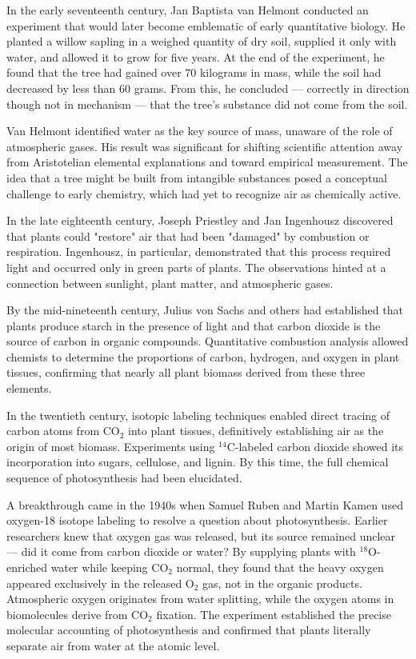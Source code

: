 \begin{historical}
In the early seventeenth century, Jan Baptista van Helmont conducted an experiment that would later become emblematic of early quantitative biology. He planted a willow sapling in a weighed quantity of dry soil, supplied it only with water, and allowed it to grow for five years. At the end of the experiment, he found that the tree had gained over 70 kilograms in mass, while the soil had decreased by less than 60 grams. From this, he concluded — correctly in direction though not in mechanism — that the tree's substance did not come from the soil.

Van Helmont identified water as the key source of mass, unaware of the role of atmospheric gases. His result was significant for shifting scientific attention away from Aristotelian elemental explanations and toward empirical measurement. The idea that a tree might be built from intangible substances posed a conceptual challenge to early chemistry, which had yet to recognize air as chemically active.

In the late eighteenth century, Joseph Priestley and Jan Ingenhousz discovered that plants could "restore" air that had been "damaged" by combustion or respiration. Ingenhousz, in particular, demonstrated that this process required light and occurred only in green parts of plants. The observations hinted at a connection between sunlight, plant matter, and atmospheric gases.

By the mid-nineteenth century, Julius von Sachs and others had established that plants produce starch in the presence of light and that carbon dioxide is the source of carbon in organic compounds. Quantitative combustion analysis allowed chemists to determine the proportions of carbon, hydrogen, and oxygen in plant tissues, confirming that nearly all plant biomass derived from these three elements.

In the twentieth century, isotopic labeling techniques enabled direct tracing of carbon atoms from \(\mathrm{CO}_2\) into plant tissues, definitively establishing air as the origin of most biomass. Experiments using \(^{14}\mathrm{C}\)-labeled carbon dioxide showed its incorporation into sugars, cellulose, and lignin. By this time, the full chemical sequence of photosynthesis had been elucidated.

A breakthrough came in the 1940s when Samuel Ruben and Martin Kamen used oxygen-18 isotope labeling to resolve a question about photosynthesis. Earlier researchers knew that oxygen gas was released, but its source remained unclear — did it come from carbon dioxide or water? By supplying plants with  \(^{18}\mathrm{O}\)-enriched water while keeping \(\mathrm{CO}_2\) normal, they found that the heavy oxygen appeared exclusively in the released \(\mathrm{O}_2\) gas, not in the organic products. Atmospheric oxygen originates from water splitting, while the oxygen atoms in biomolecules derive from \(\mathrm{CO}_2\) fixation. The experiment established the precise molecular accounting of photosynthesis and confirmed that plants literally separate air from water at the atomic level. 
\end{historical}
